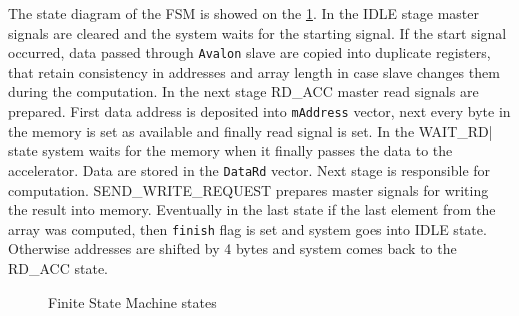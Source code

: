 The state diagram of the FSM is showed on the \figurename{} \ref{fig:fsm}. In the IDLE stage master signals are cleared and the system waits for the starting signal. If the start signal occurred, data passed through \verb|Avalon| slave are copied into duplicate registers, that retain consistency in addresses and array length in case slave changes them during the computation. In the next stage RD\_ACC master read signals are prepared. First data address is deposited into \verb|mAddress| vector, next every byte in the memory is set as available and finally read signal is set. In the WAIT\_RD| state system waits for the memory when it finally passes the data to the accelerator. Data are stored in the \verb|DataRd| vector. Next stage is responsible for computation. SEND\_WRITE\_REQUEST prepares master signals for writing the result into memory. Eventually in the last state if the last element from the array was computed, then \verb|finish| flag is set and system goes into IDLE state. Otherwise addresses are shifted by 4 bytes and system comes back to the RD\_ACC state. 
\begin{figure}[H]
	\begin{center}
	\end{center}
	\caption{Finite State Machine states}
	\label{fig:fsm}
\end{figure}

